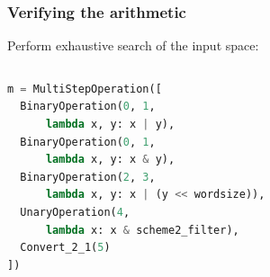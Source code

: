 \documentclass[11pt,t,usepdftitle=false,aspectratio=169]{beamer}
\begin{document}
\begin{frame}[fragile]
  \frametitle{Verifying the arithmetic}
  Perform exhaustive search of the input space:
  \begin{columns}[T]
    \begin{column}{0.48\textwidth}
      \begin{lstlisting}[language=python,basicstyle=\small]
m = MultiStepOperation([
  BinaryOperation(0, 1,
      lambda x, y: x | y),
  BinaryOperation(0, 1,
      lambda x, y: x & y),
  BinaryOperation(2, 3,
      lambda x, y: x | (y << wordsize)),
  UnaryOperation(4,
      lambda x: x & scheme2_filter),
  Convert_2_1(5)
])
      \end{lstlisting}
    \end{column}
    \hfill
  \end{columns}
\end{frame}
\end{document}
